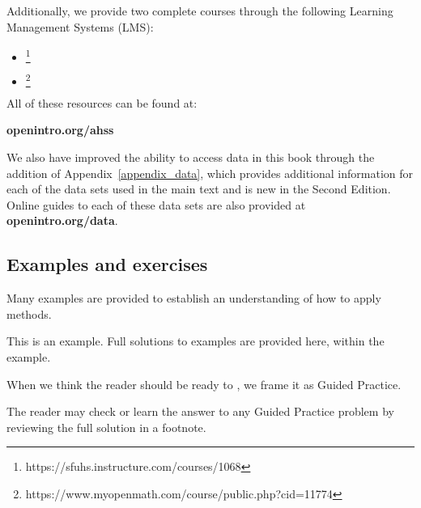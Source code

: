 \noindent Additionally, we provide two complete courses through the following Learning Management Systems (LMS):

\begin{itemize} 
\item {}\footnote{https://sfuhs.instructure.com/courses/1068} 
\item {}\footnote{https://www.myopenmath.com/course/public.php?cid=11774} 
\end{itemize}

\noindent All of these resources can be found at: 
\begin{center}
    {\color{black}\textbf{openintro.org/ahss}}
\end{center}

\noindent We also have improved the ability to access data in this book
through the addition of Appendix~\ref{appendix_data},
which provides additional information for each of the data sets
used in the main text and is new in the Second Edition.
Online guides to each of these data sets are also provided at
    {\color{black}\textbf{openintro.org/data}}.
\vspace{3mm}

\subsection*{Examples and exercises}

\noindent%
Many examples are provided to establish an understanding of how
to apply methods.

\begin{examplewrap}
\begin{nexample}{This is an example.}
  Full solutions to examples are provided here, within the example.
\end{nexample}
\end{examplewrap}

\noindent%
When we think the reader should be ready to , we frame it as Guided Practice.

\begin{exercisewrap}
\begin{nexercise}
The reader may check or learn the answer to any Guided Practice
problem by reviewing the full solution in a footnote.\footnotemark{}
\end{nexercise}
\end{exercisewrap}

